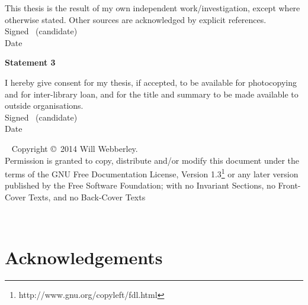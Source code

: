 This thesis is the result of my own independent work/investigation,
except where otherwise stated. Other sources are acknowledged by
explicit references.\\[2ex]
Signed \dotfill \ (candidate) \hspace*{10em}\\[1ex]
Date\ \ \ \ \ \dotfill \hspace*{18em}

\vfill

\textbf{\large Statement 3}

I hereby give consent for my thesis, if accepted, to be available for photocopying and for inter-library loan,
 and for the title and summary to be made available to outside organisations.\\[2ex]
Signed \dotfill \ (candidate) \hspace*{10em}\\[1ex]
Date\ \ \ \ \ \dotfill \hspace*{18em}

\vfill

\cleardoublepage


\thispagestyle{plain}
\ \vfill{\small
Copyright \copyright\ 2014 Will Webberley.\\
Permission is granted to copy, distribute and/or modify this document
under the terms of the GNU Free Documentation License, Version 1.3\footnote{http://www.gnu.org/copyleft/fdl.html} or
any later version published by the Free Software Foundation; with no
Invariant Sections, no Front-Cover Texts, and no Back-Cover Texts}\\[3.5ex]
\cleardoublepage


\ \vspace*{1.11cm}
\begin{flushright}
\end{flushright}
\newpage
\markboth{}{}
\cleardoublepage

\chapter*{Acknowledgements}

